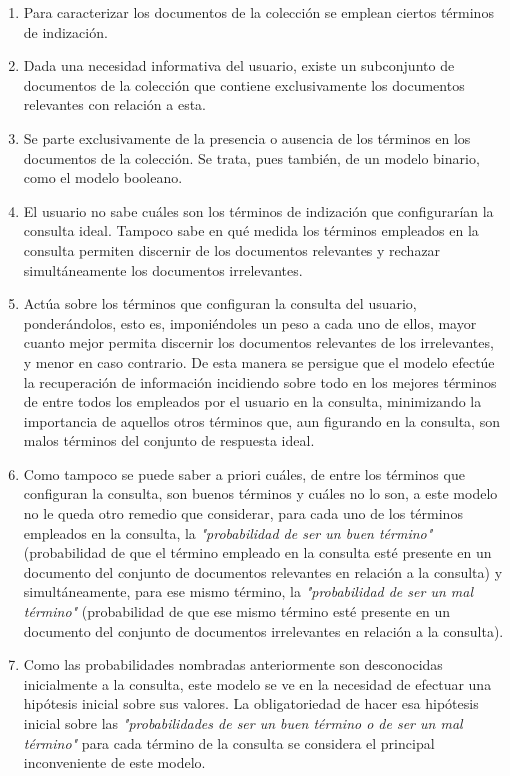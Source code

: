 \documentclass[titlepage]{article}
\begin{document}
\begin{enumerate}
	\item Para caracterizar los documentos de la colección se emplean ciertos términos de indización.
	
	\item Dada una necesidad informativa del usuario, existe un subconjunto de documentos de la colección que contiene exclusivamente los documentos relevantes con relación a esta.
	
	\item Se parte exclusivamente de la presencia o ausencia de los términos en los documentos de la colección. Se trata, pues también, de un modelo binario, como el modelo booleano.
	
	\item El usuario no sabe cuáles son los términos de indización que configurarían la consulta ideal. Tampoco sabe en qué medida los términos empleados en la consulta permiten discernir de los documentos relevantes y rechazar simultáneamente los documentos irrelevantes.
	
	\item Actúa sobre los términos que configuran la consulta del usuario, ponderándolos, esto es, imponiéndoles un peso a cada uno de ellos, mayor cuanto mejor permita discernir los documentos relevantes de los irrelevantes, y menor en caso contrario. De esta manera se persigue que el modelo efectúe la recuperación de información incidiendo sobre todo en los mejores términos de entre todos los empleados por el usuario en la consulta, minimizando la importancia de aquellos otros términos que, aun figurando en la consulta, son malos términos del conjunto de respuesta ideal.
	
	\item Como tampoco se puede saber a priori cuáles, de entre los términos que configuran la consulta, son buenos términos y cuáles no lo son, a este modelo no le queda otro remedio que considerar, para cada uno de los términos empleados en la consulta, la \textit{"probabilidad de ser un buen término"} (probabilidad de que el término empleado en la consulta esté presente en un documento del conjunto de documentos relevantes en relación a la consulta) y simultáneamente, para ese mismo término, la \textit{"probabilidad de ser un mal término"} (probabilidad de que ese mismo término esté presente en un documento del conjunto de documentos irrelevantes en relación a la consulta).
	
	\item Como las probabilidades nombradas anteriormente son desconocidas inicialmente a la consulta, este modelo se ve en la necesidad de efectuar una hipótesis inicial sobre sus valores. La obligatoriedad de hacer esa hipótesis inicial sobre las \textit{"probabilidades de ser un buen término o de ser un mal término"} para cada término de la consulta se considera el principal inconveniente de este modelo. 
\end{enumerate}
\end{document}

